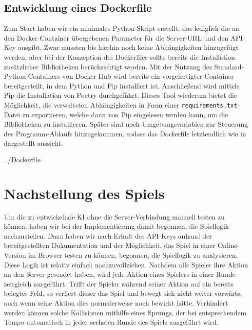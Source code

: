 \subsection{Entwicklung eines Dockerfile}
\label{subsec:dockerfile}

Zum Start haben wir ein minimales Python-Skript erstellt, das lediglich die
an den Docker-Container übergebenen Parameter für die Server-URL und den API-Key ausgibt.
Zwar mussten bis hierhin noch keine Abhängigkeiten hinzugefügt werden, aber bei der Konzeption des Dockerfiles sollte
bereits die Installation zusätzlicher Bibliotheken berücksichtigt werden.
Mit der Nutzung des Standard-Python-Containers von Docker Hub wird bereits ein vorgefertigter Container bereitgestellt,
in dem Python und Pip installiert ist.
Anschließend wird mittels Pip die Installation von Poetry durchgeführt.
Dieses Tool wiederum bietet die Möglichkeit, die verwalteten Abhängigkeiten in Form einer
\texttt{requirements.txt}-Datei zu exportieren, welche dann von Pip eingelesen werden kann, um die Bibliotheken zu
installieren.
Später sind noch Umgebungsvariablen zur Steuerung des Programm-Ablaufs hinzugekommen, sodass das Dockerfile
letztendlich wie in  dargestellt aussieht.


{../Dockerfile}

\section{Nachstellung des Spiels}
\label{sec:nachstellung-spiel}

Um die zu entwickelnde \ac{KI} ohne die Server-Verbindung manuell testen zu können, haben wir bei der Implementierung
damit begonnen, die Spiellogik nachzustellen.
Dazu haben wir nach Erhalt des API-Keys anhand der bereitgestellten Dokumentation und der Möglichkeit, das Spiel in
einer Online-Version im Browser testen zu können, begonnen, die Spiellogik zu analysieren. \\

Diese Logik ist relativ einfach nachzuvollziehen.
Nachdem alle Spieler ihre Aktion an den Server gesendet haben, wird jede Aktion eines Spielers in einer Runde zeitgleich
ausgeführt.
Trifft der Spieler während seiner Aktion auf ein bereits belegtes Feld, so verliert dieser das Spiel und bewegt sich
nicht weiter vorwärts, auch wenn seine Aktion dies normalerweise noch bewirkt hätte.
Verhindert werden können solche Kollisionen mithilfe eines Sprungs, der bei entsprechendem Tempo automatisch in jeder
sechsten Runde des Spiels ausgeführt wird. \\

